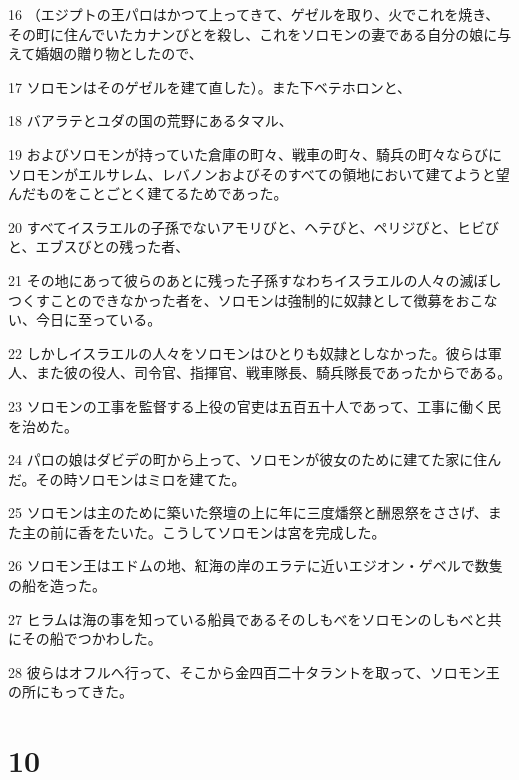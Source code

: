 \par 16 （エジプトの王パロはかつて上ってきて、ゲゼルを取り、火でこれを焼き、その町に住んでいたカナンびとを殺し、これをソロモンの妻である自分の娘に与えて婚姻の贈り物としたので、
\par 17 ソロモンはそのゲゼルを建て直した）。また下ベテホロンと、
\par 18 バアラテとユダの国の荒野にあるタマル、
\par 19 およびソロモンが持っていた倉庫の町々、戦車の町々、騎兵の町々ならびにソロモンがエルサレム、レバノンおよびそのすべての領地において建てようと望んだものをことごとく建てるためであった。
\par 20 すべてイスラエルの子孫でないアモリびと、ヘテびと、ペリジびと、ヒビびと、エブスびとの残った者、
\par 21 その地にあって彼らのあとに残った子孫すなわちイスラエルの人々の滅ぼしつくすことのできなかった者を、ソロモンは強制的に奴隷として徴募をおこない、今日に至っている。
\par 22 しかしイスラエルの人々をソロモンはひとりも奴隷としなかった。彼らは軍人、また彼の役人、司令官、指揮官、戦車隊長、騎兵隊長であったからである。
\par 23 ソロモンの工事を監督する上役の官吏は五百五十人であって、工事に働く民を治めた。
\par 24 パロの娘はダビデの町から上って、ソロモンが彼女のために建てた家に住んだ。その時ソロモンはミロを建てた。
\par 25 ソロモンは主のために築いた祭壇の上に年に三度燔祭と酬恩祭をささげ、また主の前に香をたいた。こうしてソロモンは宮を完成した。
\par 26 ソロモン王はエドムの地、紅海の岸のエラテに近いエジオン・ゲベルで数隻の船を造った。
\par 27 ヒラムは海の事を知っている船員であるそのしもべをソロモンのしもべと共にその船でつかわした。
\par 28 彼らはオフルへ行って、そこから金四百二十タラントを取って、ソロモン王の所にもってきた。

\chapter{10}

